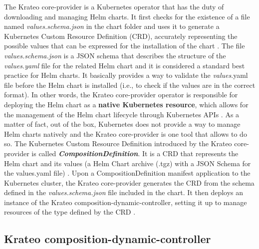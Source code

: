 The Krateo core-provider is a Kubernetes operator that has the duty of downloading and managing Helm charts. It first checks for the existence of a file named \textit{values.schema.json} in the chart folder and uses it to generate a Kubernetes Custom Resource Definition (CRD), accurately representing the possible values that can be expressed for the installation of the chart \cite{krateo_core_provider}.
The file \textit{values.schema.json} is a JSON schema that describes the structure of the \textit{values.yaml} file for the related Helm chart and it is considered a standard best practice for Helm charts. It basically provides a way to validate the \textit{values}.yaml file before the Helm chart is installed (i.e., to check if the values are in the correct format).
In other words, the Krateo core-provider operator is responsible for deploying the Helm chart as a \textbf{native Kubernetes resource}, which allows for the management of the Helm chart lifecycle through Kubernetes APIs \cite{krateo_docs}.
As a matter of fact, out of the box, Kubernetes does not provide a way to manage Helm charts natively and the Krateo core-provider is one tool that allows to do so.
The Kubernetes Custom Resource Definition introduced by the Krateo core-provider is called \textbf{\textit{CompositionDefinition}}. It is a CRD that represents the Helm chart and its values (a Helm Chart archive (.tgz) with a JSON Schema for the values.yaml file) \cite{krateo_core_provider}.
Upon a CompositionDefinition manifest application to the Kubernetes cluster, the Krateo core-provider generates the CRD from the schema defined in the \textit{values.schema.json} file included in the chart. It then deploys an instance of the Krateo composition-dynamic-controller, setting it up to manage resources of the type defined by the CRD \cite{krateo_core_provider}.

\subsection{Krateo composition-dynamic-controller}

